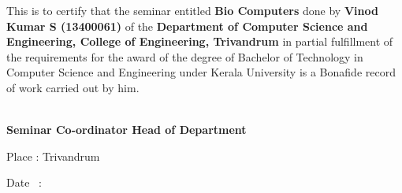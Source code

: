 \vspace{.6cm}
\begin{Large}
\begin{spacing}{1.5}
\hspace{1.5cm} This  is  to certify that the seminar entitled {\bf Bio Computers} done by {\bf  Vinod Kumar S (13400061)} of the {\bf Department of Computer Science and Engineering, College of Engineering, Trivandrum} in partial fulfillment of the requirements for the award of the degree of Bachelor of Technology in Computer Science and Engineering under Kerala University is a Bonafide record of work carried out by him.
\vspace{2cm}
\end{spacing}

\bf\Large \hspace{.3cm}\hspace{1.7cm} \hspace{3cm} \\
\bf\Large \hspace{1cm}Seminar Co-ordinator    \hspace{4cm} Head of Department

\vspace{2cm}
\begin{spacing}{1.4}
\noindent Place : Trivandrum

\noindent Date \ : 
\end{spacing}
\end{Large}

